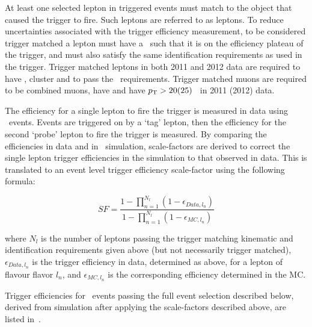 At least one selected lepton in triggered events must match to the
object that caused the trigger to fire. Such leptons are referred to as 
 leptons. To reduce uncertainties associated with the
trigger efficiency measurement, to be considered trigger matched
a lepton must have a \pt\ such that it is on the efficiency plateau of the
trigger, and must also satisfy the same identification requirements as
used in the trigger. Trigger matched leptons in both 2011 and 2012 data
are required to have , cluster  and to pass the \mediumPP\
requirements. Trigger matched muons are required to be combined muons, have
\modetalt{2.4} and have $p_{\mathrm{T}} > 20 (25)$ \gev\ in 2011 (2012) data.

The efficiency for a single lepton to fire the trigger is measured in data using
\Zll\ events. Events are triggered on by a `tag' lepton, then the efficiency for
the second `probe' lepton to fire the trigger is measured. By comparing the
efficiencies in data and in \mc\ simulation, scale-factors are derived to
correct the single lepton trigger efficiencies in the simulation to that
observed in data. 
This is translated to an event level trigger efficiency
scale-factor using the following formula:

\begin{equation}
\label{eq:triggerEffSF}
  SF =  { \frac{ {1 - \prod_{n=1}^{N_l} (1 - \epsilon_{Data,l_n})}} {1 - \prod_{n=1}^{N_l} (1 - \epsilon_{MC,l_n})} }
\end{equation}

where $N_l$ is the number of leptons passing the trigger matching kinematic and
identification requirements
given above (but not necessarily trigger matched),
$\epsilon_{Data,l_n}$ is the trigger efficiency in data, determined as above,
for a lepton of flavour flavor $l_n$, and $\epsilon_{MC,l_n}$ is
the corresponding efficiency determined in the MC. 

Trigger efficiencies for \ZZ\ events passing the full event selection
described below, derived from simulation after applying the scale-factors
described above, are listed in~\tab{triggerMCeff}.

